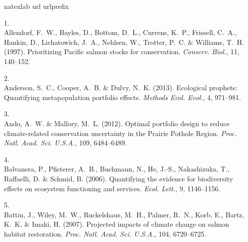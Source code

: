 \documentclass[11pt]{article}
\begin{document}
\raggedright

\linenumbers
\modulolinenumbers[2]
\begin{spacing}{1.6}
\setlength{\parindent}{0cm}



%

\begin{thebibliography}{50}
\expandafter\ifx\csname natexlab\endcsname\relax\def\natexlab#1{#1}\fi
\expandafter\ifx\csname url\endcsname\relax
  \def\url#1{\texttt{#1}}\fi
\expandafter\ifx\csname urlprefix\endcsname\relax\def\urlprefix{URL }\fi

1.\\
Allendorf, F.~W., Bayles, D., Bottom, D.~L., Currens, K.~P., Frissell, C.~A.,
  Hankin, D., Lichatowich, J.~A., Nehlsen, W., Trotter, P.~C. \& Williams,
  T.~H. (1997).
\newblock Prioritizing {Pacific} salmon stocks for conservation.
\newblock \emph{Conserv. Biol.}, 11, 140--152.

2.\\
Anderson, S.~C., Cooper, A.~B. \& Dulvy, N.~K. (2013).
\newblock Ecological prophets: Quantifying metapopulation portfolio effects.
\newblock \emph{Methods Ecol. Evol.}, 4, 971--981.

3.\\
Ando, A.~W. \& Mallory, M.~L. (2012).
\newblock Optimal portfolio design to reduce climate-related conservation
  uncertainty in the {Prairie Pothole Region}.
\newblock \emph{Proc. Natl. Acad. Sci. U.S.A.}, 109, 6484--6489.

4.\\
Balvanera, P., Pfisterer, A.~B., Buchmann, N., He, J.-S., Nakashizuka, T.,
  Raffaelli, D. \& Schmid, B. (2006).
\newblock Quantifying the evidence for biodiversity effects on ecosystem
  functioning and services.
\newblock \emph{Ecol. Lett.}, 9, 1146--1156.

5.\\
Battin, J., Wiley, M.~W., Ruckelshaus, M.~H., Palmer, R.~N., Korb, E., Bartz,
  K.~K. \& Imaki, H. (2007).
\newblock Projected impacts of climate change on salmon habitat restoration.
\newblock \emph{Proc. Natl. Acad. Sci. U.S.A.}, 104, 6720--6725.


\end{thebibliography}
\end{spacing}
\end{document}
